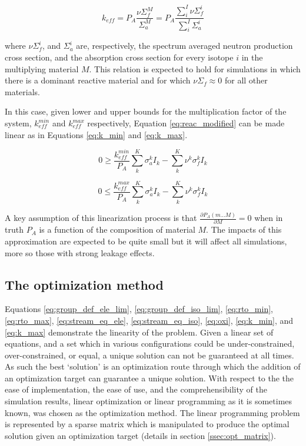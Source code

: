 \begin{equation}
\label{eq:reac_modified}
k_{eff} = P_{A} \frac{\nu\Sigma_{f}^{M}}{\Sigma_{a}^{M}} = P_{A} \frac{\sum\limits^{I}_{i}\nu\Sigma_{f}^{i}}{\sum\limits^{I}_{i}\Sigma_{a}^{i}}
\end{equation}

where $\nu\Sigma_{f}^i$, and $\Sigma_{a}^i$ are, respectively, the spectrum 
averaged neutron production cross section, and the absorption cross section for
every isotope $i$ in the multiplying material $M$. This relation is expected to
hold for simulations in which there is a dominant reactive material and for 
which $\nu\Sigma_{f} \approx 0$ for all other materials.

In this case, given lower and upper bounds for the multiplication factor of the
system, $k_{eff}^{min}$ and $k_{eff}^{max}$ respectively, 
Equation \ref{eq:reac_modified} can be  made linear as in 
Equations \ref{eq:k_min} and \ref{eq:k_max}.

\begin{equation}
\label{eq:k_min}
0 \geq \frac{k_{eff}^{min}}{P_{A}} \sum \limits_{k}^{K} \sigma_{a}^{k} I_{k} - \sum \limits_{k}^{K} \nu^{k} \sigma_{f}^{k} I_{k}
\end{equation}

\begin{equation}
\label{eq:k_max}
0 \leq \frac{k_{eff}^{max}}{P_{A}} \sum \limits_{k}^{K} \sigma_{a}^{k} I_{k} - \sum \limits_{k}^{K} \nu^{k} \sigma_{f}^{k} I_{k}
\end{equation}

A key assumption of this linearization process is that 
$\frac{\partial P_{A}(m...M)}{\partial M} = 0$ when in truth
$P_{A}$ is a function of the composition of material $M$. 
The impacts of this approximation are expected to be quite small but it will 
affect all simulations, more so those with strong leakage effects.
%

\subsection{The optimization method} \label{ssec:opt}
Equations \ref{eq:group_def_ele_lim}, \ref{eq:group_def_iso_lim}, 
\ref{eq:rto_min}, \ref{eq:rto_max}, \ref{eq:stream_eq_ele}, 
\ref{eq:stream_eq_iso}, \ref{eq:oxi}, \ref{eq:k_min}, and \ref{eq:k_max} 
demonstrate the linearity of the problem.  Given a linear
set of equations, and a set which in various configurations could be
under-constrained, over-constrained, or equal, a unique solution can not be
guaranteed at all times. As such the best `solution' is an optimization route
through which the addition of an optimization target can guarantee a unique
solution. With respect to the the ease of implementation, the ease of use, and
the comprehensibility of the simulation results,
linear optimization or linear programming as it is sometimes known, was
chosen as the optimization method. The linear
programming problem is represented by a sparse matrix which is manipulated to 
produce the optimal solution given an optimization target 
(details in section \ref{ssec:opt_matrix}).



